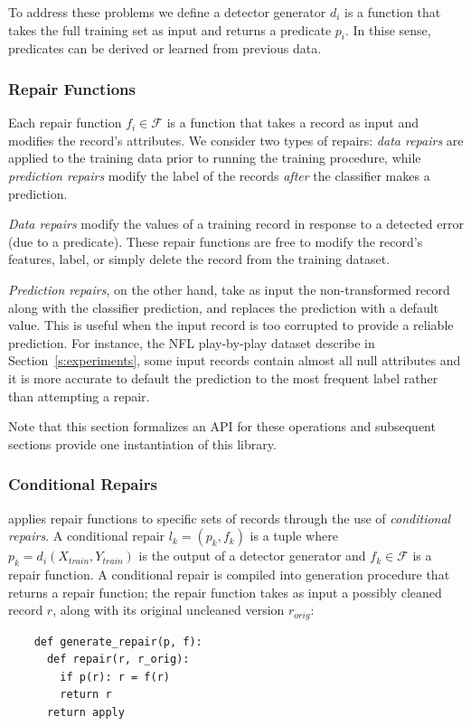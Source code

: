 To address these problems we define a detector generator $d_i$ is a function that takes the full training set as input and returns a predicate $p_i$. 
In thise sense, predicates can be derived or learned from previous data.

\subsubsection{Repair Functions}
Each repair function $f_i \in \mathcal{F}$ is a function that takes a record as input and modifies the record's attributes.  We consider two types of repairs:  {\it data repairs} are applied to the training data prior to running the training procedure, while {\it prediction repairs} modify the label of the records {\it after} the classifier makes a prediction.   

{\it Data repairs} modify the values of a training record in response to a detected error (due to a predicate).  These repair functions are free to modify the record's features, label, or simply delete the record from the training dataset.  

{\it Prediction repairs}, on the other hand, take as input the non-transformed record along with the classifier prediction, and replaces the prediction with a default value.  This is useful when the input record is too corrupted to provide a reliable prediction.  For instance, the NFL play-by-play dataset describe in Section~\ref{s:experiments}, some input records contain almost all null attributes and it is more accurate to default the prediction to the most frequent label rather than attempting a repair.

Note that this section formalizes an API for these operations and subsequent sections provide one instantiation of this library.

\subsubsection{Conditional Repairs}
\sys applies repair functions to specific sets of records through the use of {\it conditional repairs}.  A conditional repair $l_k = (p_k, f_k)$ is a tuple where $p_k = d_i(X_{train}, Y_{train})$ is the output of a detector generator and $f_k \in \mathcal{F}$ is a repair function. 
A conditional repair is compiled into generation procedure that returns a repair function; the repair function takes as input a possibly cleaned record $r$, along with its original uncleaned version $r_{orig}$:
{\small\begin{verbatim}
    def generate_repair(p, f):
      def repair(r, r_orig):
        if p(r): r = f(r)   
        return r 
      return apply
\end{verbatim}}

